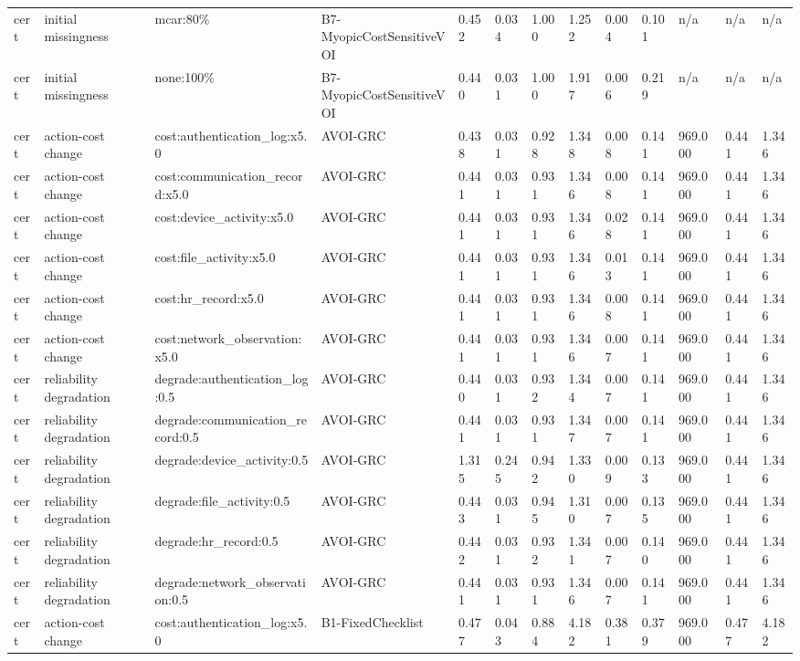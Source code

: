 \begin{table}[!ht]
{\begin{tabular}{lllllllllllll}
cert & initial missingness & mcar:80\% & B7-MyopicCostSensitiveVOI & 0.452 & 0.034 & 1.000 & 1.252 & 0.004 & 0.101 & n/a & n/a & n/a \\
cert & initial missingness & none:100\% & B7-MyopicCostSensitiveVOI & 0.440 & 0.031 & 1.000 & 1.917 & 0.006 & 0.219 & n/a & n/a & n/a \\
cert & action-cost change & cost:authentication\_log:x5.0 & AVOI-GRC & 0.438 & 0.031 & 0.928 & 1.348 & 0.008 & 0.141 & 969.000 & 0.441 & 1.346 \\
cert & action-cost change & cost:communication\_record:x5.0 & AVOI-GRC & 0.441 & 0.031 & 0.931 & 1.346 & 0.008 & 0.141 & 969.000 & 0.441 & 1.346 \\
cert & action-cost change & cost:device\_activity:x5.0 & AVOI-GRC & 0.441 & 0.031 & 0.931 & 1.346 & 0.028 & 0.141 & 969.000 & 0.441 & 1.346 \\
cert & action-cost change & cost:file\_activity:x5.0 & AVOI-GRC & 0.441 & 0.031 & 0.931 & 1.346 & 0.013 & 0.141 & 969.000 & 0.441 & 1.346 \\
cert & action-cost change & cost:hr\_record:x5.0 & AVOI-GRC & 0.441 & 0.031 & 0.931 & 1.346 & 0.008 & 0.141 & 969.000 & 0.441 & 1.346 \\
cert & action-cost change & cost:network\_observation:x5.0 & AVOI-GRC & 0.441 & 0.031 & 0.931 & 1.346 & 0.007 & 0.141 & 969.000 & 0.441 & 1.346 \\
cert & reliability degradation & degrade:authentication\_log:0.5 & AVOI-GRC & 0.440 & 0.031 & 0.932 & 1.344 & 0.007 & 0.141 & 969.000 & 0.441 & 1.346 \\
cert & reliability degradation & degrade:communication\_record:0.5 & AVOI-GRC & 0.441 & 0.031 & 0.931 & 1.347 & 0.007 & 0.141 & 969.000 & 0.441 & 1.346 \\
cert & reliability degradation & degrade:device\_activity:0.5 & AVOI-GRC & 1.315 & 0.245 & 0.942 & 1.330 & 0.009 & 0.133 & 969.000 & 0.441 & 1.346 \\
cert & reliability degradation & degrade:file\_activity:0.5 & AVOI-GRC & 0.443 & 0.031 & 0.945 & 1.310 & 0.007 & 0.135 & 969.000 & 0.441 & 1.346 \\
cert & reliability degradation & degrade:hr\_record:0.5 & AVOI-GRC & 0.442 & 0.031 & 0.932 & 1.341 & 0.007 & 0.140 & 969.000 & 0.441 & 1.346 \\
cert & reliability degradation & degrade:network\_observation:0.5 & AVOI-GRC & 0.441 & 0.031 & 0.931 & 1.346 & 0.007 & 0.141 & 969.000 & 0.441 & 1.346 \\
cert & action-cost change & cost:authentication\_log:x5.0 & B1-FixedChecklist & 0.477 & 0.043 & 0.884 & 4.182 & 0.381 & 0.379 & 969.000 & 0.477 & 4.182 \\

\end{tabular}}
\end{table}
